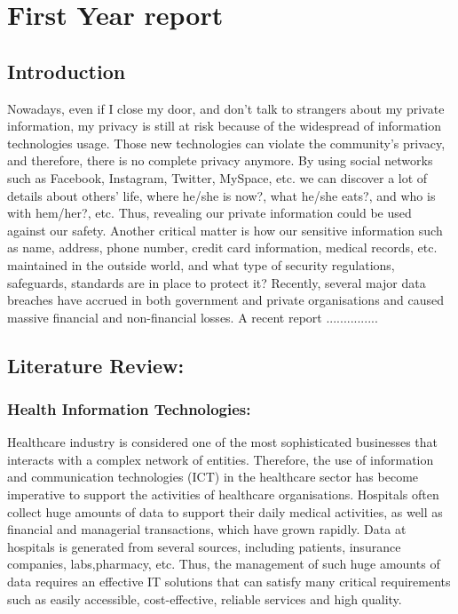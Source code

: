 


\chapter{First Year report}
\label{c:First Year}

\section{Introduction}

Nowadays, even if I close my door, and don’t talk to strangers about my private information, my privacy is still at risk because of the widespread of information technologies usage. Those new technologies can violate the community’s privacy, and therefore, there is no complete privacy anymore. By using social networks such as Facebook, Instagram, Twitter, MySpace, etc. we can discover a lot of details about others’ life, where he/she is now?, what he/she eats?, and who is with hem/her?, etc. Thus, revealing our private information could be used against our safety. Another critical matter is how our sensitive information such as name, address, phone number, credit card information, medical records, etc. maintained in the outside world, and what type of security regulations, safeguards, standards are in place to protect it? Recently, several major data breaches have accrued in both government and private organisations and caused massive financial and non-financial losses. A recent report ...............

\section{Literature Review:}
\subsection{Health Information Technologies:}


Healthcare industry is considered one of the most sophisticated businesses that interacts with a complex network of entities. Therefore, the use of information and communication technologies (ICT) in the healthcare sector has become imperative to support the activities of healthcare organisations. Hospitals often collect huge amounts of data to support their daily medical activities, as well as financial and managerial transactions, which have grown rapidly. Data at hospitals is generated from several sources, including patients, insurance companies, labs,pharmacy, etc. Thus, the management of such huge amounts of data requires an effective IT solutions that can satisfy many critical requirements such as easily accessible, cost-effective, reliable services and high quality.

